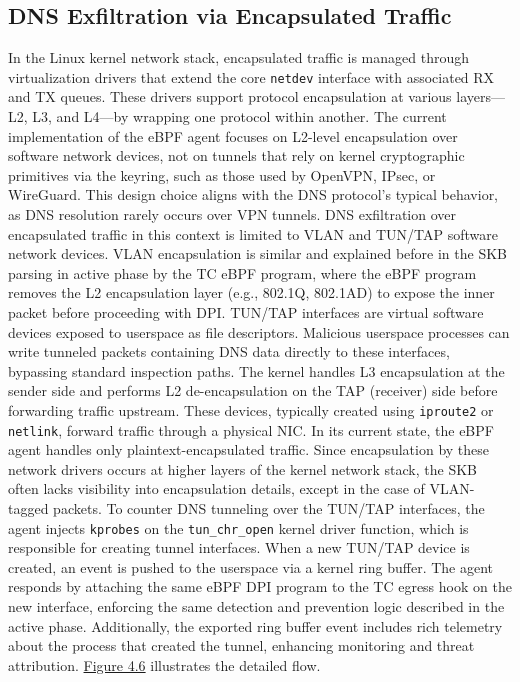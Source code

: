\documentclass [11pt, proquest] {uwthesis}[2020/02/24]
\begin{document}
\subsection{DNS Exfiltration via Encapsulated Traffic}
\label{sec:encap}
In the Linux kernel network stack, encapsulated traffic is managed through virtualization drivers that extend the core \texttt{netdev} interface with associated RX and TX queues. These drivers support protocol encapsulation at various layers—L2, L3, and L4—by wrapping one protocol within another. 
The current implementation of the eBPF agent focuses on L2-level encapsulation over software network devices, not on tunnels that rely on kernel cryptographic primitives via the keyring, such as those used by OpenVPN, IPsec, or WireGuard. This design choice aligns with the DNS protocol’s typical behavior, as DNS resolution rarely occurs over VPN tunnels. DNS exfiltration over encapsulated traffic in this context is limited to VLAN and TUN/TAP software network devices. VLAN encapsulation is similar and explained before in the SKB parsing in active phase by the TC eBPF program, where the eBPF program removes the L2 encapsulation layer (e.g., 802.1Q, 802.1AD) to expose the inner packet before proceeding with DPI.
TUN/TAP interfaces are virtual software devices exposed to userspace as file descriptors. Malicious userspace processes can write tunneled packets containing DNS data directly to these interfaces, bypassing standard inspection paths. The kernel handles L3 encapsulation at the sender side and performs L2 de-encapsulation on the TAP (receiver) side before forwarding traffic upstream. These devices, typically created using \texttt{iproute2} or \texttt{netlink}, forward traffic through a physical NIC. In its current state, the eBPF agent handles only plaintext-encapsulated traffic. Since encapsulation by these network drivers occurs at higher layers of the kernel network stack, the SKB often lacks visibility into encapsulation details, except in the case of VLAN-tagged packets. To counter DNS tunneling over the TUN/TAP interfaces, the agent injects \texttt{kprobes} on the \texttt{tun\_chr\_open} kernel driver function, which is responsible for creating tunnel interfaces. When a new TUN/TAP device is created, an event is pushed to the userspace via a kernel ring buffer. The agent responds by attaching the same eBPF DPI program to the TC egress hook on the new interface, enforcing the same detection and prevention logic described in the active phase. 
Additionally, the exported ring buffer event includes rich telemetry about the process that created the tunnel, enhancing monitoring and threat attribution. \hyperref[sec:data_plane_tunnel_netdev]{Figure 4.6} illustrates the detailed flow.
\end{document}
